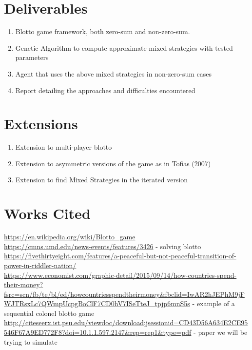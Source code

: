 \documentclass[12pt,letter]{article}
\begin{document}
\section{Deliverables} %
\begin{enumerate}
	\item Blotto game framework, both zero-sum and non-zero-sum.
	\item Genetic Algorithm to compute approximate mixed strategies with tested parameters
	\item Agent that uses the above mixed strategies in non-zero-sum cases
	\item Report detailing the approaches and difficulties encountered
\end{enumerate}
\section{Extensions} %
\begin{enumerate}
	\item Extension to multi-player blotto
	\item Extension to asymmetric versions of the game as in Tofias (2007)
	\item Extension to find Mixed Strategies in the iterated version
\end{enumerate}
\section{Works Cited} %
\url{https://en.wikipedia.org/wiki/Blotto_game} \\
\url{https://cmns.umd.edu/news-events/features/3426} - solving blotto \\
\url{https://fivethirtyeight.com/features/a-peaceful-but-not-peaceful-transition-of-power-in-riddler-nation/} \\
\url{https://www.economist.com/graphic-detail/2015/09/14/how-countries-spend-their-money?fsrc=scn/fb/te/bl/ed/howcountriesspendtheirmoney&fbclid=IwAR2hJEPhM9jFWJTRsxLc7QWmpUcpgBoClF7CD0hV7ISeTteJ_tpjp6mnS5s} - example of a sequential colonel blotto game \\
\url{http://citeseerx.ist.psu.edu/viewdoc/download;jsessionid=CD43D56A634E2CE95546F67A9ED772F8?doi=10.1.1.597.2147&rep=rep1&type=pdf} - paper we will be trying to simulate
\end{document}
